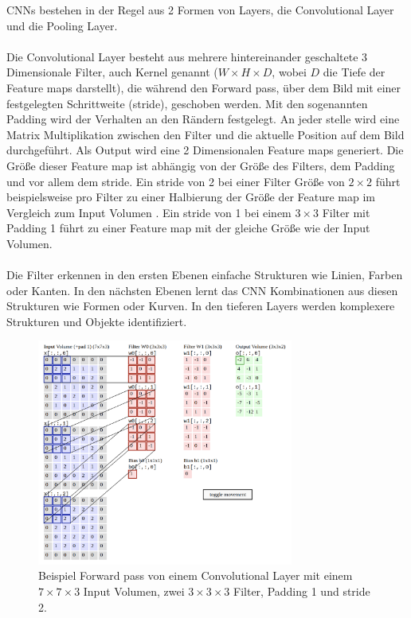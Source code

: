 \gls{CNN}s bestehen in der Regel aus 2 Formen von \gls{Layer}s, die Convolutional \gls{Layer} und die Pooling Layer. 
\\
\\
Die Convolutional \gls{Layer} besteht aus mehrere hintereinander geschaltete 3 Dimensionale
Filter, auch Kernel genannt ($ W \times H \times D$, wobei $D$ die Tiefe der Feature maps darstellt), die während den Forward pass, über dem Bild 
mit einer festgelegten Schrittweite (\gls{stride}), geschoben werden. Mit den sogenannten Padding wird der Verhalten an den Rändern festgelegt.
An jeder stelle wird eine Matrix Multiplikation zwischen den Filter und die aktuelle Position auf dem Bild durchgeführt. 
Als Output wird eine 2 Dimensionalen Feature maps generiert. Die Größe dieser Feature map ist abhängig 
von der Größe des Filters, dem Padding und vor allem dem \gls{stride}. Ein \gls{stride} von 2 bei einer Filter Größe von $ 2\times2 $ führt beispielsweise 
pro Filter zu einer Halbierung der Größe der Feature map im Vergleich zum Input Volumen \cite{aufbau-funktion-convnet}.
Ein \gls{stride} von 1 bei einem $ 3\times3 $ Filter mit Padding 1 führt zu einer Feature map mit der gleiche Größe wie der Input Volumen.
\\
\\
Die Filter erkennen in den ersten Ebenen einfache Strukturen wie Linien, Farben oder Kanten. In den nächsten Ebenen lernt das CNN Kombinationen aus 
diesen Strukturen wie Formen oder Kurven. In den tieferen \gls{Layer}s werden komplexere Strukturen und Objekte identifiziert. 

\begin{figure}[H]
  \centering
  \includegraphics[width=0.75\textwidth]{resources/cnn/funktion-cnn.png}
  \caption{
    Beispiel Forward pass von einem Convolutional \gls{Layer} mit einem $ 7\times7\times3 $ Input Volumen, zwei $3\times3\times3$ Filter, 
    Padding 1 und \gls{stride} 2.
    \cite{convnet-demo}
  }
  \label{image:convnet-demo}
\end{figure}

